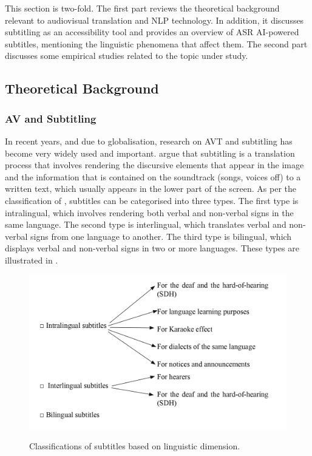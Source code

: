 \documentclass[english]{textolivre}
\begin{document}
This section is two-fold. The first part reviews the theoretical
background relevant to audiovisual translation and NLP technology. In
addition, it discusses subtitling as an accessibility tool and provides
an overview of ASR AI-powered subtitles, mentioning the linguistic
phenomena that affect them. The second part discusses some empirical
studies related to the topic under study.

\subsection{Theoretical Background}\label{subsec-theretical-Background}
\subsubsection{AV and Subtitling}\label{subsubsec-AV-and-subtitling}

In recent years, and due to globalisation, research on AVT and
subtitling has become very widely used and important.
\textcite{diaz-cintas__2007} argue that
subtitling is a translation process that involves rendering the
discursive elements that appear in the image and the information that is
contained on the soundtrack (songs, voices off) to a written text, which
usually appears in the lower part of the screen. As per the
classification of \textcite{diaz-cintas__2007}, subtitles can be categorised into three types. The first type
is intralingual, which involves rendering both verbal and non-verbal
signs in the same language. The second type is interlingual, which
translates verbal and non-verbal signs from one language to another. The
third type is bilingual, which displays verbal and non-verbal signs in
two or more languages. These types are illustrated in .

\begin{figure}[htbp]
\centering
\begin{minipage}{.7\textwidth}
\includegraphics[width=\textwidth]{Picture1.pdf}
\caption{Classifications of subtitles based on linguistic dimension.}
\label{fig:fig1}
\end{minipage}
\end{figure}
\end{document}
